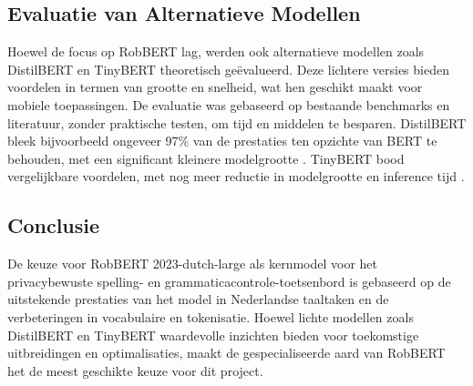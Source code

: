 \subsection{Evaluatie van Alternatieve Modellen}

Hoewel de focus op RobBERT lag, werden ook alternatieve modellen zoals DistilBERT en TinyBERT theoretisch geëvalueerd. Deze lichtere versies bieden voordelen in termen van grootte en snelheid, wat hen geschikt maakt voor mobiele toepassingen. De evaluatie was gebaseerd op bestaande benchmarks en literatuur, zonder praktische testen, om tijd en middelen te besparen. DistilBERT bleek bijvoorbeeld ongeveer 97\% van de prestaties ten opzichte van BERT te behouden, met een significant kleinere modelgrootte \autocite{Sanh2019DistilBERT}. TinyBERT bood vergelijkbare voordelen, met nog meer reductie in modelgrootte en inference tijd \autocite{Jiao2019TinyBERT}.

\subsection{Conclusie}

De keuze voor RobBERT 2023-dutch-large als kernmodel voor het privacybewuste spelling- en grammaticacontrole-toetsenbord is gebaseerd op de uitstekende prestaties van het model in Nederlandse taaltaken en de verbeteringen in vocabulaire en tokenisatie. Hoewel lichte modellen zoals DistilBERT en TinyBERT waardevolle inzichten bieden voor toekomstige uitbreidingen en optimalisaties, maakt de gespecialiseerde aard van RobBERT het de meest geschikte keuze voor dit project.
